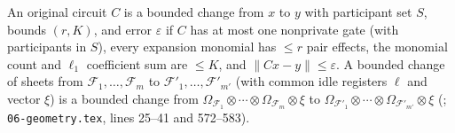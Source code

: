 \begin{definition}
    \label{def:peps_bounded_change}
    \leanok
    An original circuit $C$ is a bounded change from $x$ to $y$ with participant set $S$, bounds $(r,K)$, and error $\varepsilon$ if $C$ has at most one nonprivate gate (with participants in $S$), every expansion monomial has $\le r$ pair effects, the monomial count and $\ell_1$ coefficient sum are $\le K$, and $\lVert Cx-y\rVert\le\varepsilon$. A bounded change of sheets from $\mathcal F_1,\dots,\mathcal F_m$ to $\mathcal F'_1,\dots,\mathcal F'_{m'}$ (with common idle registers $\ell$ and vector $\xi$) is a bounded change from $\Omega_{\mathcal F_1}\otimes\cdots\otimes\Omega_{\mathcal F_m}\otimes\xi$ to $\Omega_{\mathcal F'_1}\otimes\cdots\otimes\Omega_{\mathcal F'_{m'}}\otimes\xi$ (\cite[Proposition~7.1, items 2 and 4]{OpenAI2026PolynomialPEPS}; \texttt{06-geometry.tex}, lines 25--41 and 572--583).
\end{definition}

